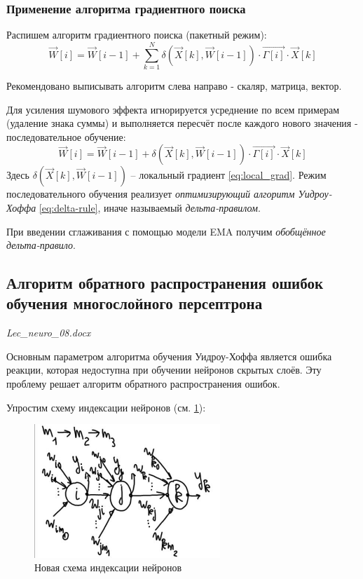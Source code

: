 \documentclass{article}
\numberwithin{equation}{subsection}
\begin{document}
\subsubsection{Применение алгоритма градиентного поиска}

Распишем алгоритм градиентного поиска (пакетный режим):
\begin{equation}
    \vec{W}[i] = \vec{W}[i-1] + \sum_{k=1}^{N} \delta(\vec{X}[k], \vec{W}[i-1])\cdot \vec{\Gamma[i]} \cdot \vec{X}[k]
\end{equation}

\begin{myquote}
    Рекомендовано выписывать алгоритм слева направо - скаляр, матрица, вектор.
\end{myquote}

Для усиления шумового эффекта игнорируется усреднение по всем примерам (удаление знака суммы) и выполняется 
пересчёт после каждого нового значения - последовательное обучение:
\begin{equation}
    \vec{W}[i] = \vec{W}[i-1] + \delta(\vec{X}[k], \vec{W}[i-1])\cdot \vec{\Gamma[i]} \cdot \vec{X}[k]
    \label{eq:delta-rule}
\end{equation}
Здесь $\delta(\vec{X}[k], \vec{W}[i-1])$ -- локальный градиент \ref{eq:local_grad}. Режим последовательного обучения 
реализует \textit{оптимизирующий алгоритм Уидроу-Хоффа} \ref{eq:delta-rule}, 
иначе называемый \textit{дельта-правилом}.

При введении сглаживания с помощью модели EMA получим \textit{обобщённое дельта-правило}.



\subsection{Алгоритм обратного распространения ошибок обучения многослойного персептрона}

\begin{myquote}
    \textit{Lec\_neuro\_08.docx}
\end{myquote}

Основным параметром алгоритма обучения Уидроу-Хоффа является ошибка реакции, которая 
недоступна при обучении нейронов скрытых слоёв.
Эту проблему решает алгоритм обратного распространения ошибок.

Упростим схему индексации нейронов (см. \ref{hyperflat_10_1}):

\begin{figure}[htbp]
    \centering
    \includegraphics[width=7cm]{hyperflat_10_1.jpeg}
    \caption{Новая схема индексации нейронов}
    \label{hyperflat_10_1}
\end{figure}
\end{document}
